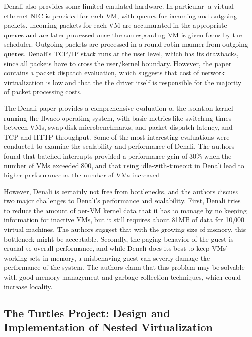 \documentclass[letterpaper, twocolumn]{article}
\begin{document}
Denali also provides some limited emulated hardware.  In particular, a virtual ethernet NIC is 
provided for each VM, with queues for incoming and outgoing packets.
Incoming packets for each VM are accumulated in the appropriate queues and are later processed once the
corresponding VM is given focus by the scheduler.  Outgoing packets are processed in a
round-robin manner from outgoing queues. Denali's TCP/IP stack runs at the user level, which
has its drawbacks, since all packets have to cross the user/kernel boundary. However, the paper contains
a packet dispatch evaluation, which suggests that cost of network virtualization is low and that the the
driver itself is responsible for the majority of packet processing costs.

The Denali paper provides a comprehensive evaluation of the isolation kernel running
the Ilwaco operating system, with basic metrics like switching times between VMs, swap disk
microbenchmarks, and packet dispatch latency, and TCP and HTTP throughput. Some of the most
interesting evaluations were conducted to examine the scalability and performance of Denali.
The authors found that batched interrupts provided a performance gain of 30\% when the number
of VMs exceeded 800, and that using idle-with-timeout in Denali lead to higher performance as
the number of VMs increased.

However, Denali is certainly not free from bottlenecks, and the authors discuss two major challenges to
Denali's performance and scalability. First, Denali tries to reduce the amount of per-VM kernel data
that it has to manage by no keeping information for inactive VMs, but it still requires about 81MB
of data for 10,000 virtual machines. The authors suggest that with the growing size of memory,
this bottleneck might be acceptable. Secondly, the paging behavior of the guest is crucial to overall performance,
and while Denali does its best to keep VMs' working sets in memory, a misbehaving guest can severly damage the
performance of the system.  The authors claim that this problem may be solvable with good memory management 
and garbage collection techniques, which could increase locality.

\subsection{The Turtles Project: Design and Implementation of Nested Virtualization}
\label{sec:summaries/turtles}
\end{document}
